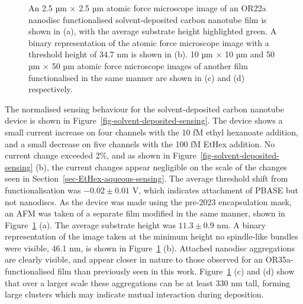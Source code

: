 \documentclass[
  a4paper,
]{scrbook}
\begin{document}
\begin{figure}
\begin{minipage}[t]{0.01\linewidth}
\end{minipage}%

\caption{\label{fig-solvent-deposited-AFM-comparison}An 2.5 µm
\(\times\) 2.5 µm atomic force microscope image of an OR22a nanodisc
functionalised solvent-deposited carbon nanotube film is shown in (a),
with the average substrate height highlighted green. A binary
representation of the atomic force microscope image with a threshold
height of 34.7 nm is shown in (b). 10 µm \(\times\) 10 µm and 50 µm
\(\times\) 50 µm atomic force microscope images of another film
functionalised in the same manner are shown in (c) and (d)
respectively.}

\end{figure}

The normalised sensing behaviour for the solvent-deposited carbon
nanotube device is shown in Figure~\ref{fig-solvent-deposited-sensing}.
The device shows a small current increase on four channels with the 10
fM ethyl hexanoate addition, and a small decrease on five channels with
the 100 fM EtHex addition. No current change exceeded 2\%, and as shown
in Figure~\ref{fig-solvent-deposited-sensing} (b), the current changes
appear negligible on the scale of the changes seen in
Section~\ref{sec-EtHex-aqueous-sensing}. The average threshold shift
from functionalisation was \(-0.02\pm0.01\) V, which indicates
attachment of PBASE but not nanodiscs. As the device was made using the
pre-2023 encapsulation mask, an AFM was taken of a separate film
modified in the same manner, shown in
Figure~\ref{fig-solvent-deposited-AFM-comparison} (a). The average
substrate height was \(11.3\pm0.9\) nm. A binary representation of the
image taken at the minimum height no spindle-like bundles were visible,
46.1 nm, is shown in Figure~\ref{fig-solvent-deposited-AFM-comparison}
(b). Attached nanodisc aggregations are clearly visible, and appear
closer in nature to those observed for an OR35a-functionalised film
\autocite{Murugathas2020} than previously seen in this work.
Figure~\ref{fig-solvent-deposited-AFM-comparison} (c) and (d) show that
over a larger scale these aggregations can be at least 330 nm tall,
forming large clusters which may indicate mutual interaction during
deposition.
\end{document}
